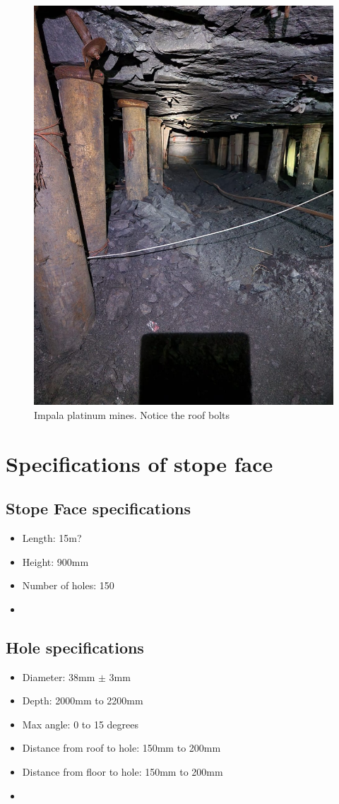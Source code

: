 	\begin{figure}[H]
		\centering
		\includegraphics[width=0.7\linewidth]{Images/Impala6}
		\caption{Impala platinum mines. Notice the roof bolts}
		\label{fig:Impala6}
	\end{figure}
	
\section{Specifications of stope face}
	
	\subsection{Stope Face specifications}
		\begin{itemize}
			\item Length: 15m? 
			\item Height: 900mm
			\item Number of holes: 150
			\item 
		\end{itemize}
		
	\subsection{Hole specifications}
		\begin{itemize}
			\item Diameter: 38mm $\pm$ 3mm
			\item Depth: 2000mm to 2200mm
			\item Max angle: 0 to 15 degrees
			\item Distance from roof to hole: 150mm to 200mm
			\item Distance from floor to hole: 150mm to 200mm
			\item 
		\end{itemize}
		
